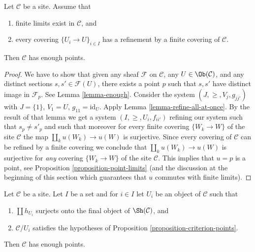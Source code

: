 \begin{proposition}
\label{proposition-criterion-points}
\begin{reference}
\cite[Expos\'e VI, Appendix by Deligne, Proposition 9.0]{SGA4}
\end{reference}
Let $\mathcal{C}$ be a site. Assume that
\begin{enumerate}
\item finite limits exist in $\mathcal{C}$, and
\item every covering $\{U_i \to U\}_{i \in I}$
has a refinement by a finite covering of $\mathcal{C}$.
\end{enumerate}
Then $\mathcal{C}$ has enough points.
\end{proposition}

\begin{proof}
We have to show that given any sheaf
$\mathcal{F}$ on $\mathcal{C}$, any $U \in \Ob(\mathcal{C})$,
and any distinct sections $s, s' \in \mathcal{F}(U)$, there exists
a point $p$ such that $s, s'$ have distinct image in
$\mathcal{F}_p$. See Lemma \ref{lemma-enough}.
Consider the system $(J, \geq, V_j, g_{jj'})$
with $J = \{1\}$, $V_1 = U$, $g_{11} = \text{id}_U$.
Apply Lemma \ref{lemma-refine-all-at-once}.
By the result of that lemma we get a system
$(I, \geq, U_i, f_{ii'})$ refining our system such
that $s_p \not = s'_p$ and such that moreover for every
finite covering $\{W_k \to W\}$ of the site $\mathcal{C}$ the map
$\coprod_k u(W_k) \to u(W)$ is surjective.
Since every covering of $\mathcal{C}$ can be refined by
a finite covering we conclude that
$\coprod_k u(W_k) \to u(W)$ is surjective for {\it any}
covering $\{W_k \to W\}$ of the site $\mathcal{C}$.
This implies that $u = p$ is a point, see
Proposition \ref{proposition-point-limits} (and the discussion
at the beginning of this section which guarantees that $u$
commutes with finite limits).
\end{proof}

\begin{lemma}
\label{lemma-criterion-points}
Let $\mathcal{C}$ be a site. Let $I$ be a set and for
$i \in I$ let $U_i$ be an object of $\mathcal{C}$ such that
\begin{enumerate}
\item $\coprod h_{U_i}$ surjects onto
the final object of $\Sh(\mathcal{C})$, and
\item $\mathcal{C}/U_i$ satisfies the hypotheses of
Proposition \ref{proposition-criterion-points}.
\end{enumerate}
Then $\mathcal{C}$ has enough points.
\end{lemma}

